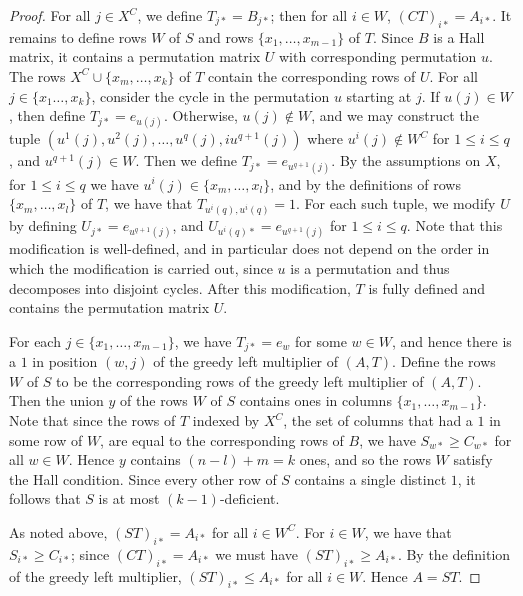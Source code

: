 \documentclass[11pt]{article}
\numberwithin{equation}{section}
\begin{document}
\begin{proof}
  For all $j \in X^C$, we define $T_{j*} = B_{j*}$; then for all $i \in W$,
  $(CT)_{i*} = A_{i*}$. It remains to define rows $W$ of $S$ and rows $\{x_1,
    \ldots, x_{m - 1}\}$ of $T$. Since $B$ is a Hall matrix, it contains a
  permutation matrix $U$ with corresponding permutation $u$. The rows $X^C
  \cup \{x_m, \ldots, x_k\}$ of $T$ contain the corresponding rows of $U$. For
  all $j \in \{x_1 \ldots, x_k\}$, consider the cycle in the permutation $u$
  starting at $j$. If $u(j) \in W$, then define $T_{j*} = e_{u(j)}$. Otherwise,
  $u(j) \not\in W$, and we may construct the tuple $(u^1(j), u^2(j), \ldots,
  u^{q}(j), iu^{q+1}(j))$ where $u^{i}(j) \not\in W^C$ for $1 \leq i \leq q$,
  and $u^{q + 1}(j) \in W$. Then we define $T_{j*} = e_{u^{q + 1}(j)}$. By the
  assumptions on $X$, for $1 \leq i \leq q$ we have $u^{i}(j) \in \{x_m, \ldots,
    x_l\}$, and by the definitions of rows $\{x_m, \ldots, x_l\}$ of $T$, we
  have that $T_{u^{i}(q),u^{i}(q)} = 1$. For each such tuple, we modify $U$ by
  defining $U_{j*} = e_{u^{q + 1}(j)}$, and $U_{u^{i}(q)*} = e_{u^{q + 1}(j)}$
  for $1 \leq i \leq q$. Note that this modification is well-defined, and in
  particular does not depend on the order in which the modification is carried
  out, since $u$ is a permutation and thus decomposes into disjoint cycles.
  After this modification, $T$ is fully defined and contains the permutation
  matrix $U$.

  For each $j \in \{x_1, \ldots, x_{m - 1}\}$, we have $T_{j*} = e_w$ for some
  $w \in W$, and hence there is a $1$ in position $(w, j)$ of the greedy left
  multiplier of $(A, T)$. Define the rows $W$ of $S$ to be the corresponding
  rows of the greedy left multiplier of $(A, T)$. Then the union $y$ of the rows
  $W$ of $S$ contains ones in columns $\{x_1, \ldots, x_{m - 1}\}$. Note that
    since the rows of $T$ indexed by $X^C$, the set of columns that had a $1$ in
    some row of $W$, are equal to the corresponding rows of $B$, we have $S_{w*}
    \geq C_{w*}$ for all $w \in W$. Hence $y$ contains $(n - l) + m = k$ ones,
    and so the rows $W$ satisfy the Hall condition. Since every other row of $S$
    contains a single distinct $1$, it follows that $S$ is at most $(k -
    1)$-deficient.

  As noted above, $(ST)_{i*} = A_{i*}$ for all $i \in W^C$. For $i \in W$, we
  have that $S_{i*} \geq C_{i*}$; since $(CT)_{i*} = A_{i*}$ we must have
  $(ST)_{i*} \geq A_{i*}$. By the definition of the greedy left multiplier,
  $(ST)_{i*} \leq A_{i*}$ for all $i \in W$. Hence $A = ST$.
    

\end{proof}
\end{document}
